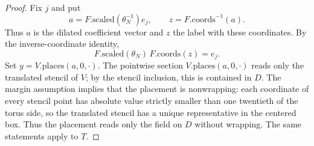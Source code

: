 \begin{proof}
Fix $j$ and put
\[
 a=F.\mathrm{scaled}(\theta_N^{-1})e_j,
 \qquad z=F.\mathrm{coords}^{-1}(a).
\]
Thus $a$ is the dilated coefficient vector and $z$ the label with these
coordinates. By the inverse-coordinate identity,
\[
          F.\mathrm{scaled}(\theta_N)\,F.\mathrm{coords}(z)=e_j.
\]
Set
$y=V.\mathrm{places}(a,0,\cdot)$. The pointwise section
$V.\mathrm{places}(a,0,\cdot)$ reads only the translated stencil of $V$;
by the stencil inclusion, this is contained in $D$. The margin assumption
implies that the placement is nonwrapping: each coordinate of every
stencil point has absolute value strictly smaller than one twentieth of
the torus side, so the translated stencil has a unique representative in
the centered box. Thus the placement reads only the field on $D$ without wrapping.
The same statements apply to $T$.


\end{proof}
